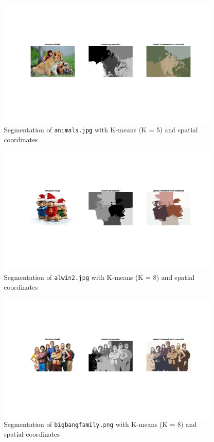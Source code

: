 \begin{figure}[hbt]
\centering
\includegraphics[trim={50px 250px 50px 225px},clip,width=\textwidth]{img/kmeans/animals_k5_spatial.png}
\caption{Segmentation of \texttt{animals.jpg} with K-means (K = 5) and spatial coordinates}
\label{fig:animals-k5-spatial}
\end{figure}

\begin{figure}[hbt]
\centering
\includegraphics[trim={50px 250px 50px 170px},clip,width=\textwidth]{img/kmeans/alwin2_k8_spatial.png}
\caption{Segmentation of \texttt{alwin2.jpg} with K-means (K = 8) and spatial coordinates}
\label{fig:alwin2-k8-spatial}
\end{figure}

\begin{figure}[hbt]
\centering
\includegraphics[trim={50px 250px 50px 200px},clip,width=\textwidth]{img/kmeans/bigbangfamily_k8_spatial.png}
\caption{Segmentation of \texttt{bigbangfamily.png} with K-means (K = 8) and spatial coordinates}
\label{fig:bigbangfamily-k8-spatial}
\end{figure}

